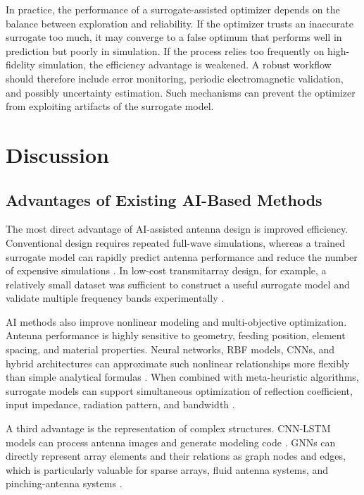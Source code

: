 \documentclass{article}
\begin{document}
In practice, the performance of a surrogate-assisted optimizer depends on the balance between exploration and reliability. If the optimizer trusts an inaccurate surrogate too much, it may converge to a false optimum that performs well in prediction but poorly in simulation. If the process relies too frequently on high-fidelity simulation, the efficiency advantage is weakened. A robust workflow should therefore include error monitoring, periodic electromagnetic validation, and possibly uncertainty estimation. Such mechanisms can prevent the optimizer from exploiting artifacts of the surrogate model.

\section{Discussion}

\subsection{Advantages of Existing AI-Based Methods}

The most direct advantage of AI-assisted antenna design is improved efficiency. Conventional design requires repeated full-wave simulations, whereas a trained surrogate model can rapidly predict antenna performance and reduce the number of expensive simulations \cite{sarker2023review,khan2022review}. In low-cost transmitarray design, for example, a relatively small dataset was sufficient to construct a useful surrogate model and validate multiple frequency bands experimentally \cite{belen2023transmitarray}.

AI methods also improve nonlinear modeling and multi-objective optimization. Antenna performance is highly sensitive to geometry, feeding position, element spacing, and material properties. Neural networks, RBF models, CNNs, and hybrid architectures can approximate such nonlinear relationships more flexibly than simple analytical formulas \cite{feng2022ann,mishra2015rbf}. When combined with meta-heuristic algorithms, surrogate models can support simultaneous optimization of reflection coefficient, input impedance, radiation pattern, and bandwidth \cite{singh2024polygon,huang2024meta}.

A third advantage is the representation of complex structures. CNN-LSTM models can process antenna images and generate modeling code \cite{wei2023cnn}. GNNs can directly represent array elements and their relations as graph nodes and edges, which is particularly valuable for sparse arrays, fluid antenna systems, and pinching-antenna systems \cite{yang2024doa,he2025fluid,xie2025pinching}.
\end{document}
